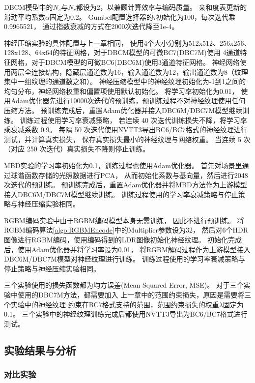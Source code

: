 DBCM模型中的$N_s$与$N_r$都设为2，以兼顾计算效率与编码质量。
亲和度表更新的滑动平均系数$\alpha$固定为0.2。
Gumbel配置选择器的$\tau$初始化为100，每次迭代乘0.9965521，
通过指数衰减的方式在2000次迭代降至1e-4。

神经压缩实验的具体配置与上一章相同，
使用4个大小分别为512x512、256x256、128x128、64x64的特征网格，对于DBCM模型的可微BC7(DBC7M)使用
4通道特征网格，对于DBCM模型的可微BC6(DBC6M)使用3通道特征网格。
神经网络使用两层全连接结构，隐藏层通道数为16，输入通道数为12，输出通道数为8（纹理集中一组纹理的通道数之和）。
神经压缩模型中的神经纹理初始化为-1到1之间的均匀分布，神经网络权重和偏置项使用默认初始化。
将学习率初始化为0.01，
使用Adam优化器先进行10000次迭代的预训练，预训练过程不对神经纹理使用任何压缩方法。
预训练完成后，重置Adam优化器并接入DBC6M/DBC7M模型继续训练。
训练过程使用学习率衰减策略，
若连续 40 次迭代训练损失不降，将学习率乘衰减系数 0.9。
每隔 50 次迭代使用NVTT3导出BC6/BC7格式的神经纹理进行测试，并计算真实损失，
保存真实损失最小的神经纹理与网络权重。
当连续 5 次（对应 250 次迭代）真实损失不降则停止训练。

MBD实验的学习率初始化为0.1，训练过程也使用Adam优化器。
首先对场景里通过球谐函数存储的光照数据进行PCA，
从而初始化系数与基向量，然后进行2048次迭代的预训练。
预训练完成后，重置Adam优化器并将MBD方法作为上游模型接入DBC6M/DBC7M模型继续训练。
训练过程使用的学习率衰减策略与停止策略与神经压缩实验相同。

RGBM编码实验中由于RGBM编码模型本身无需训练，
因此不进行预训练。
将RGBM编码算法\ref{algo:RGBMEncode}中的Multiplier参数设为32，
然后对6个HDR图像进行RGBM编码，使用编码得到的LDR图像初始化神经纹理。
初始化完成后，使用Adam优化器并将学习率设为0.01，
将RGBM解码过程作为上游模型接入DBC6M/DBC7M模型对神经纹理进行训练。
训练过程使用的学习率衰减策略与停止策略与神经压缩实验相同。

三个实验使用的损失函数都为均方误差(Mean Squared Error, MSE)。
对于三个实验中使用的DBC7M方法，都需要加入
上一章中的范围约束损失，原因是需要将三个实验中的神经纹理
约束在BC7格式支持的范围，范围约束损失的权重$\lambda$固定为0.1。
三个实验中的神经纹理训练完成后都使用NVTT3导出为BC6/BC7格式进行测试。

\subsection{实验结果与分析}

\subsubsection{对比实验}
\label{4:对比实验}

